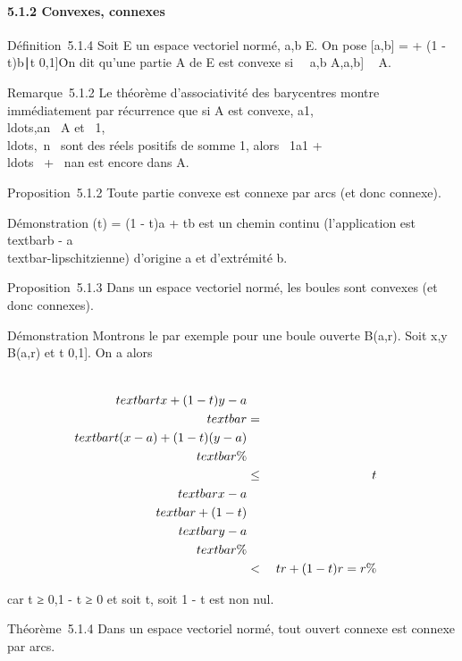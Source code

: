 \paragraph{5.1.2 Convexes, connexes}

Définition~5.1.4 Soit E un espace vectoriel normé, a,b \in E. On pose
{[}a,b{]} = \ta + (1 - t)b∣t
\in {[}0,1{]}\. On dit qu'une partie A de E est convexe
si \forall~~a,b \in A,\quad {[}a,b{]} \subset~
A.

Remarque~5.1.2 Le théorème d'associativité des barycentres montre
immédiatement par récurrence que si A est convexe,
a1,\\ldots,an~
\in A et
\lambda~1,\\ldots,\lambda~n~
sont des réels positifs de somme 1, alors \lambda~1a1 +
\\ldots~ +
\lambda~nan est encore dans A.

Proposition~5.1.2 Toute partie convexe est connexe par arcs (et donc
connexe).

Démonstration \gamma(t) = (1 - t)a + tb est un chemin continu (l'application
est \\textbar{}b -
a\\textbar{}-lipschitzienne) d'origine a et d'extrémité
b.

Proposition~5.1.3 Dans un espace vectoriel normé, les boules sont
convexes (et donc connexes).

Démonstration Montrons le par exemple pour une boule ouverte B(a,r).
Soit x,y \in B(a,r) et t \in {[}0,1{]}. On a alors

\begin{align*} \\textbar{}tx + (1 -
t)y - a\\textbar{}& =& \\textbar{}t(x -
a) + (1 - t)(y - a)\\textbar{}\%&
\\ & \leq& t\\textbar{}x -
a\\textbar{} + (1 - t)\\textbar{}y -
a\\textbar{} \%& \\ &
\textless{}& tr + (1 - t)r = r \%& \\
\end{align*}

car t ≥ 0,1 - t ≥ 0 et soit t, soit 1 - t est non nul.

Théorème~5.1.4 Dans un espace vectoriel normé, tout ouvert connexe est
connexe par arcs.

